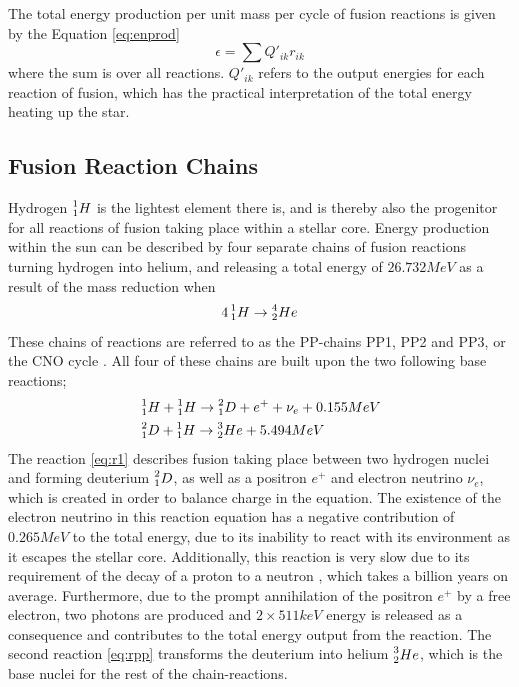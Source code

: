 \documentclass[10pt, nofootinbib, twocolumn]{revtex4-1}
\begin{document}
The total energy production per unit mass per cycle of fusion reactions is given by the Equation \eqref{eq:enprod}
\begin{equation}
    \epsilon = \sum{Q'_{ik} r_{ik}} \label{eq:enprod}
\end{equation}
where the sum is over all reactions. $Q'_{ik}$ refers to the output energies for each reaction of fusion, which has the practical interpretation of the total energy heating up the star.



\newpage
\subsection{Fusion Reaction Chains}
Hydrogen $\prescript{1}{1}H$ is the lightest element there is, and is thereby also the progenitor for all reactions of fusion taking place within a stellar core. Energy production within the sun can be described by four separate chains of fusion reactions turning hydrogen into helium, and releasing a total energy of $26.732 MeV$ as a result of the mass reduction when
$$4\prescript{1}{1}H\rightarrow \prescript{4}{2}He$$
These chains of reactions are referred to as the PP-chains PP1, PP2 and PP3, or the CNO cycle \cite{ast}. All four of these chains are built upon the two following base reactions;
\begin{align}
    &\prescript{1}{1}H+\prescript{1}{1}H\rightarrow \prescript{2}{1}D+e^++\nu_e+0.155MeV \label{eq:r1}\\
    &\prescript{2}{1}D+\prescript{1}{1}H\rightarrow\prescript{3}{2}He + 5.494MeV \label{eq:rpp}
\end{align}
The reaction \eqref{eq:r1} describes fusion taking place between two hydrogen nuclei and forming deuterium $\prescript{2}{1}D$, as well as a positron $e^+$ and electron neutrino $\nu_e$, which is created in order to balance charge in the equation. The existence of the electron neutrino in this reaction equation has a negative contribution of $0.265MeV$ to the total energy, due to its inability to react with its environment as it escapes the stellar core. Additionally, this reaction is very slow due to its requirement of the decay of a proton to a neutron \cite{ast}, which takes a billion years on average. Furthermore, due to the prompt annihilation of the positron $e^+$ by a free electron, two photons are produced and $2\times 511keV$ energy is released as a consequence and contributes to the total energy output from the reaction. The second reaction \eqref{eq:rpp} transforms the deuterium into helium $\prescript{3}{2}He$, which is the base nuclei for the rest of the chain-reactions.
\end{document}
